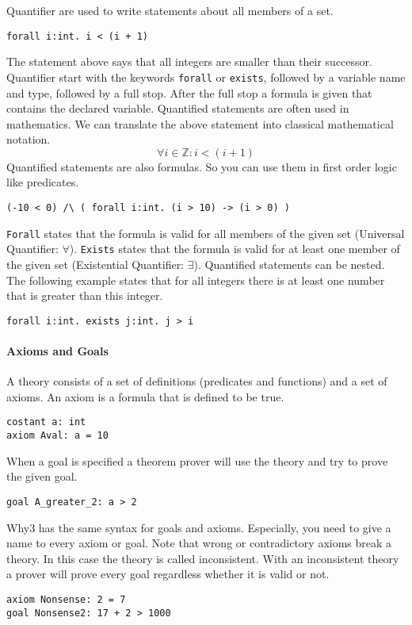 Quantifier are used to write statements about all members of a set.
\begin{lstlisting}
forall i:int. i < (i + 1)
\end{lstlisting}
The statement above says that all integers are smaller than their 
successor. Quantifier start with the keywords \verb"forall" or \verb"exists", 
followed by a variable name and type, followed by a full stop. After
the full stop a formula is given that contains the declared variable.
Quantified statements are often used in mathematics. We can translate the
above statement into classical mathematical notation.
\[\forall i \in \mathbb{Z}: i < (i + 1)\]
Quantified statements are also formulas. So you can use them in first order
logic like predicates.
\begin{lstlisting}
(-10 < 0) /\ ( forall i:int. (i > 10) -> (i > 0) ) 
\end{lstlisting}
\verb"Forall" states that the formula is valid for all members of the given set
(Universal Quantifier: $\forall$).
\verb"Exists" states that the formula is valid for at least one member of the 
given set (Existential Quantifier: $\exists$).
Quantified statements can be nested. The following example states that
for all integers there is at least one number that is greater than this
integer.
\begin{lstlisting}
forall i:int. exists j:int. j > i
\end{lstlisting}

\paragraph{Axioms and Goals}

A theory consists of a set of definitions (predicates and functions) and 
a set of axioms. An axiom is a formula that is defined to be true.
\begin{lstlisting}
costant a: int
axiom Aval: a = 10
\end{lstlisting}
When a goal is specified a theorem prover will use the theory and try to
prove the given goal.
\begin{lstlisting}
goal A_greater_2: a > 2
\end{lstlisting}
Why3 has the same syntax for goals and axioms. Especially, you need to 
give a name to every axiom or goal.
Note that wrong or contradictory axioms break a theory. 
In this case the theory is called inconsistent.
With an inconsistent theory a prover will prove every goal regardless
whether it is valid or not.
\begin{lstlisting}
axiom Nonsense: 2 = 7
goal Nonsense2: 17 + 2 > 1000
\end{lstlisting}

